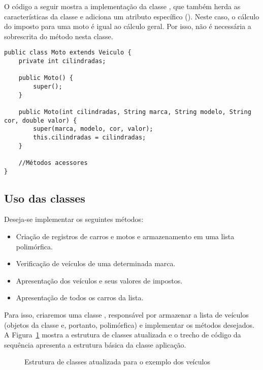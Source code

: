 O código a seguir mostra a implementação da classe , que também herda as características da classe  e adiciona um atributo específico (). Neste caso, o cálculo do imposto para uma moto é igual ao cálculo geral. Por isso, não é necessária a sobrescrita do método  nesta classe.

\begin{verbatim}
public class Moto extends Veiculo {
	private int cilindradas;

	public Moto() {
		super();
	}

	public Moto(int cilindradas, String marca, String modelo, String cor, double valor) {
		super(marca, modelo, cor, valor);
		this.cilindradas = cilindradas;
	}

	//Métodos acessores
}
\end{verbatim}

\subsection{Uso das classes}

Deseja-se implementar os seguintes métodos:
\begin{itemize}
	\item Criação de registros de carros e motos e armazenamento em uma lista polimórfica.
	\item Verificação de veículos de uma determinada marca.
	\item Apresentação dos veículos e seus valores de impostos.
	\item Apresentação de todos os carros da lista.
\end{itemize}

Para isso, criaremos uma classe , responsável por armazenar a lista de veículos (objetos da classe  e, portanto, polimórfica) e implementar os métodos desejados. A Figura~\ref{fig:exemplo-carro-moto-aplicacao} mostra a estrutura de classes atualizada e o trecho de código da sequência apresenta a estrutura básica da classe aplicação.

\begin{figure}[h]
	\centering
	
	
	\caption{Estrutura de classes atualizada para o exemplo dos veículos}
	\label{fig:exemplo-carro-moto-aplicacao}
\end{figure}

